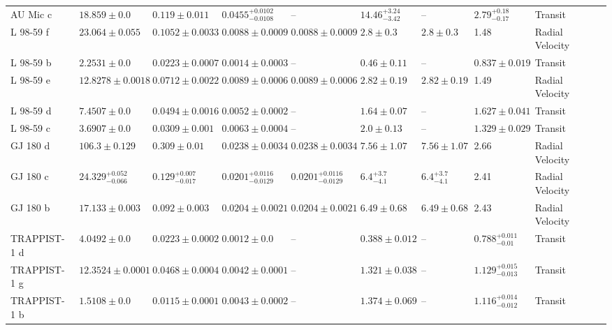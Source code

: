 \begin{tabular}{llllllllll}
AU Mic c & $18.859 \pm 0.0$ & $0.119 \pm 0.011$ & $0.0455^{+0.0102}_{-0.0108}$ & -- & $14.46^{+3.24}_{-3.42}$ & -- & $2.79^{+0.18}_{-0.17}$ & Transit & \cite{MALLORQUIN_ET_AL_2024} \\
L 98-59 f & $23.064 \pm 0.055$ & $0.1052 \pm 0.0033$ & $0.0088 \pm 0.0009$ & $0.0088 \pm 0.0009$ & $2.8 \pm 0.3$ & $2.8 \pm 0.3$ & 1.48 & Radial Velocity & \cite{CADIEUX_ET_AL_2025} \\
L 98-59 b & $2.2531 \pm 0.0$ & $0.0223 \pm 0.0007$ & $0.0014 \pm 0.0003$ & -- & $0.46 \pm 0.11$ & -- & $0.837 \pm 0.019$ & Transit & \cite{CADIEUX_ET_AL_2025} \\
L 98-59 e & $12.8278 \pm 0.0018$ & $0.0712 \pm 0.0022$ & $0.0089 \pm 0.0006$ & $0.0089 \pm 0.0006$ & $2.82 \pm 0.19$ & $2.82 \pm 0.19$ & 1.49 & Radial Velocity & \cite{CADIEUX_ET_AL_2025} \\
L 98-59 d & $7.4507 \pm 0.0$ & $0.0494 \pm 0.0016$ & $0.0052 \pm 0.0002$ & -- & $1.64 \pm 0.07$ & -- & $1.627 \pm 0.041$ & Transit & \cite{CADIEUX_ET_AL_2025} \\
L 98-59 c & $3.6907 \pm 0.0$ & $0.0309 \pm 0.001$ & $0.0063 \pm 0.0004$ & -- & $2.0 \pm 0.13$ & -- & $1.329 \pm 0.029$ & Transit & \cite{CADIEUX_ET_AL_2025} \\
GJ 180 d & $106.3 \pm 0.129$ & $0.309 \pm 0.01$ & $0.0238 \pm 0.0034$ & $0.0238 \pm 0.0034$ & $7.56 \pm 1.07$ & $7.56 \pm 1.07$ & 2.66 & Radial Velocity & \cite{FENG_ET_AL__2020} \\
GJ 180 c & $24.329^{+0.052}_{-0.066}$ & $0.129^{+0.007}_{-0.017}$ & $0.0201^{+0.0116}_{-0.0129}$ & $0.0201^{+0.0116}_{-0.0129}$ & $6.4^{+3.7}_{-4.1}$ & $6.4^{+3.7}_{-4.1}$ & 2.41 & Radial Velocity & \cite{TUOMI_ET_AL__2014} \\
GJ 180 b & $17.133 \pm 0.003$ & $0.092 \pm 0.003$ & $0.0204 \pm 0.0021$ & $0.0204 \pm 0.0021$ & $6.49 \pm 0.68$ & $6.49 \pm 0.68$ & 2.43 & Radial Velocity & \cite{FENG_ET_AL__2020} \\
TRAPPIST-1 d & $4.0492 \pm 0.0$ & $0.0223 \pm 0.0002$ & $0.0012 \pm 0.0$ & -- & $0.388 \pm 0.012$ & -- & $0.788^{+0.011}_{-0.01}$ & Transit & \cite{AGOL_ET_AL__2021} \\
TRAPPIST-1 g & $12.3524 \pm 0.0001$ & $0.0468 \pm 0.0004$ & $0.0042 \pm 0.0001$ & -- & $1.321 \pm 0.038$ & -- & $1.129^{+0.015}_{-0.013}$ & Transit & \cite{AGOL_ET_AL__2021} \\
TRAPPIST-1 b & $1.5108 \pm 0.0$ & $0.0115 \pm 0.0001$ & $0.0043 \pm 0.0002$ & -- & $1.374 \pm 0.069$ & -- & $1.116^{+0.014}_{-0.012}$ & Transit & \cite{AGOL_ET_AL__2021} \\

\end{tabular}
